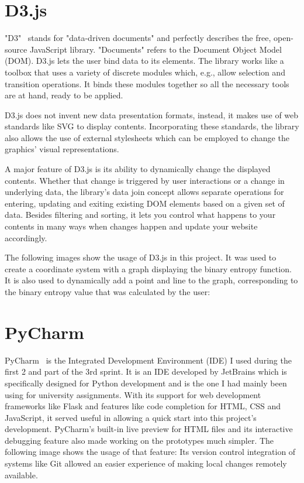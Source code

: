 \section{D3.js}
"D3"~\cite{d3js_what_is_d3} stands for "data-driven documents" and perfectly describes the free, open-source JavaScript library. "Documents" refers to the Document Object Model (DOM). D3.js lets the user bind data to its elements. The library works like a toolbox that uses a variety of discrete modules which, e.g., allow selection and transition operations. It binds these modules together so all the necessary tools are at hand, ready to be applied.

D3.js does not invent new data presentation formats, instead, it makes use of web standards like SVG to display contents. Incorporating these standards, the library also allows the use of external stylesheets which can be employed to change the graphics' visual representations.

A major feature of D3.js is its ability to dynamically change the displayed contents. Whether that change is triggered by user interactions or a change in underlying data, the library's data join concept allows separate operations for entering, updating and exiting existing DOM elements based on a given set of data. Besides filtering and sorting, it lets you control what happens to your contents in many ways when changes happen and update your website accordingly.

The following images show the usage of D3.js in this project. It was used to create a coordinate system with a graph displaying the binary entropy function. It is also used to dynamically add a point and line to the graph, corresponding to the binary entropy value that was calculated by the user:

\section{PyCharm} \label{pycharm}
PyCharm~\cite{pycharm} is the Integrated Development Environment (IDE) I used during the first 2 and part of the 3rd sprint. It is an IDE developed by JetBrains which is specifically designed for Python development and is the one I had mainly been using for university assignments. With its support for web development frameworks like Flask and features like code completion for HTML, CSS and JavaScript, it served useful in allowing a quick start into this project's development.
PyCharm's built-in live preview for HTML files and its interactive debugging feature also made working on the prototypes much simpler. The following image shows the usage of that feature:
Its version control integration of systems like Git allowed an easier experience of making local changes remotely available.

